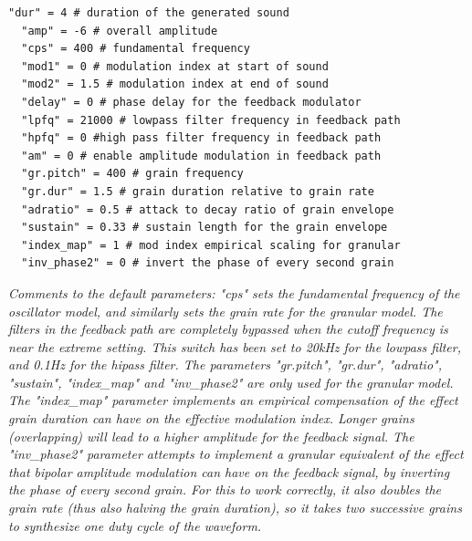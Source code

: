 \documentclass[runningheads,a4paper]{llncs}
\begin{document}
\noindent\begin{minipage}{\linewidth}
\begin{lstlisting}[caption=Default parameters for the synthesis models, label=lst:defaultparameters]
  "dur" = 4 # duration of the generated sound
  "amp" = -6 # overall amplitude
  "cps" = 400 # fundamental frequency 
  "mod1" = 0 # modulation index at start of sound
  "mod2" = 1.5 # modulation index at end of sound
  "delay" = 0 # phase delay for the feedback modulator
  "lpfq" = 21000 # lowpass filter frequency in feedback path
  "hpfq" = 0 #high pass filter frequency in feedback path
  "am" = 0 # enable amplitude modulation in feedback path
  "gr.pitch" = 400 # grain frequency 
  "gr.dur" = 1.5 # grain duration relative to grain rate
  "adratio" = 0.5 # attack to decay ratio of grain envelope
  "sustain" = 0.33 # sustain length for the grain envelope
  "index_map" = 1 # mod index empirical scaling for granular
  "inv_phase2" = 0 # invert the phase of every second grain
\end{lstlisting}
\emph{Comments to the default parameters: "cps" sets the fundamental frequency of the oscillator model, and similarly sets the grain rate for the granular model. The filters in the feedback path are completely bypassed when the cutoff frequency is near the extreme setting. This switch has been set to 20kHz for the lowpass filter, and 0.1Hz for the hipass filter. The parameters "gr.pitch", "gr.dur", "adratio", "sustain", "index\_map" and "inv\_phase2" are only used for the granular model. The "index\_map" parameter implements an empirical compensation of the effect grain duration can have on the effective modulation index. Longer grains (overlapping) will lead to a higher amplitude for the feedback signal. The "inv\_phase2" parameter attempts to implement a granular equivalent of the effect that bipolar amplitude modulation can have on the feedback signal, by inverting the phase of every second grain. For this to work correctly, it also doubles the grain rate (thus also halving the grain duration), so it takes two successive grains to synthesize one duty cycle of the waveform.}
	
\end{minipage}
\end{document}
